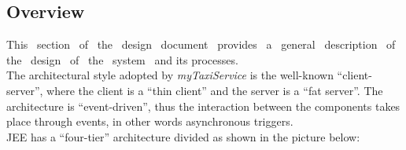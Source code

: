 \documentclass[a4paper,11pt]{report} %
\newcommand{\mts}{\mbox{\normalfont\itshape myTaxiService}}
\begin{document}
	\subsection{Overview} This  section  of  the  design  document  provides  a  general  description  of  the  design  of  the  system  and  its  processes.\\
	The architectural style adopted by \mts{} is the well-known ``client-server'', where the client is a ``thin client'' and the server is a ``fat server''. The architecture is ``event-driven'', thus the interaction between the components takes place through events, in other words asynchronous triggers. \\	
	JEE has a ``four-tier'' architecture divided as shown in the picture below:\\
		\begin{minipage}{\linewidth}
		\end{minipage}	
\end{document}
